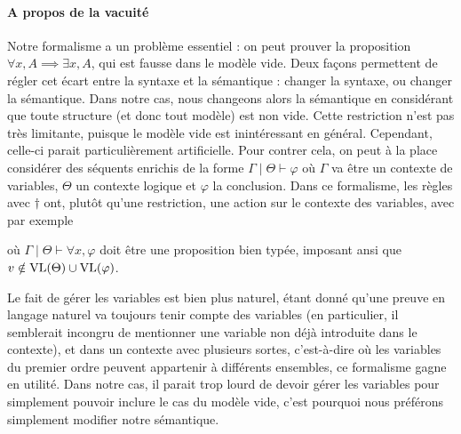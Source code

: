 \paragraph{A propos de la vacuité}
Notre formalisme a un problème essentiel : on peut prouver la proposition
$\forall x, A \implies \exists x, A$, qui est fausse dans le modèle vide. Deux
façons permettent de régler cet écart entre la syntaxe et la sémantique :
changer la syntaxe, ou changer la sémantique. Dans notre cas, nous changeons
alors la sémantique en considérant que toute structure (et donc tout modèle)
est non vide. Cette restriction n'est pas très limitante, puisque le modèle vide
est inintéressant en général. Cependant, celle-ci parait particulièrement
artificielle. Pour contrer cela, on peut à la place considérer des séquents
enrichis de la forme $\Gamma\mid \Theta \vdash \varphi$ où $\Gamma$ va être un
contexte de variables, $\Theta$ un contexte logique et $\varphi$ la conclusion.
Dans ce formalisme, les règles avec $\dagger$ ont, plutôt qu'une restriction,
une action sur le contexte des variables, avec par exemple
\begin{prooftree}
\end{prooftree}
où $\Gamma\mid\Theta\vdash \forall x, \varphi$ doit être une proposition bien
typée, imposant ansi que $v\notin\VL(\Theta)\cup\VL(\varphi)$.

Le fait de gérer les variables est bien plus naturel, étant donné qu'une preuve
en langage naturel va toujours tenir compte des variables (en particulier, il
semblerait incongru de mentionner une variable non déjà introduite dans le
contexte), et dans un contexte avec plusieurs sortes, c'est-à-dire où les
variables du premier ordre peuvent appartenir à différents ensembles, ce
formalisme gagne en utilité. Dans notre cas, il parait trop lourd de devoir
gérer les variables pour simplement pouvoir inclure le cas du modèle vide,
c'est pourquoi nous préférons simplement modifier notre sémantique.

